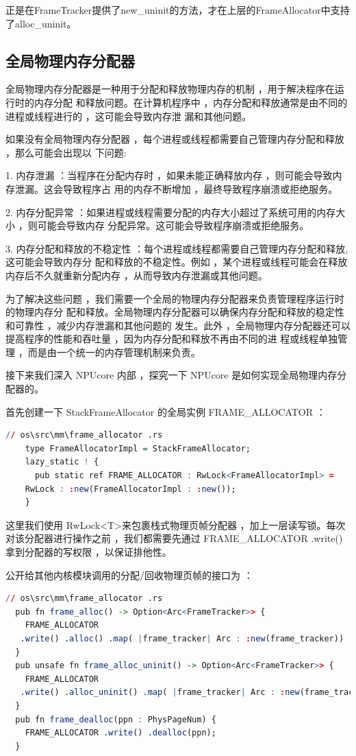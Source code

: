 正是在FrameTracker提供了new\_uninit的方法，才在上层的FrameAllocator中支持了alloc\_uninit。

	\subsection{全局物理内存分配器}
	
	全局物理内存分配器是一种用于分配和释放物理内存的机制 ，用于解决程序在运行时的内存分配 和释放问题。在计算机程序中 ，内存分配和释放通常是由不同的进程或线程进行的 ，这可能会导致内存泄 漏和其他问题。
	
	如果没有全局物理内存分配器 ，每个进程或线程都需要自己管理内存分配和释放 ，那么可能会出现以 下问题:
	
	1. 内存泄漏 ：当程序在分配内存时 ，如果未能正确释放内存 ，则可能会导致内存泄漏。这会导致程序占 用的内存不断增加 ，最终导致程序崩溃或拒绝服务。
	
	2. 内存分配异常 ：如果进程或线程需要分配的内存大小超过了系统可用的内存大小 ，则可能会导致内存 分配异常。这可能会导致程序崩溃或拒绝服务。
	
	3. 内存分配和释放的不稳定性 ：每个进程或线程都需要自己管理内存分配和释放,这可能会导致内存分 配和释放的不稳定性。例如 ，某个进程或线程可能会在释放内存后不久就重新分配内存 ，从而导致内存泄漏或其他问题。
	
	为了解决这些问题 ，我们需要一个全局的物理内存分配器来负责管理程序运行时的物理内存分 配和释放。全局物理内存分配器可以确保内存分配和释放的稳定性和可靠性 ，减少内存泄漏和其他问题的 发生。此外 ，全局物理内存分配器还可以提高程序的性能和吞吐量 ，因为内存分配和释放不再由不同的进 程或线程单独管理 ，而是由一个统一的内存管理机制来负责。
	
	接下来我们深入 NPUcore 内部 ，探究一下 NPUcore 是如何实现全局物理内存分配器的。
	
	首先创建一下  StackFrameAllocator 的全局实例  FRAME\_ALLOCATOR  ：
\begin{lstlisting}[language=R]
  // os\src\mm\frame_allocator .rs
    type FrameAllocatorImpl = StackFrameAllocator;
    lazy_static ! {
      pub static ref FRAME_ALLOCATOR : RwLock<FrameAllocatorImpl> =
    RwLock : :new(FrameAllocatorImpl : :new());
    }
\end{lstlisting}

	这里我们使用  RwLock\textless T\textgreater 来包裹栈式物理页帧分配器 ，加上一层读写锁。每次对该分配器进行操作之前 ，我们都需要先通过  FRAME\_ALLOCATOR .write() 拿到分配器的写权限 ，以保证排他性。
	
	公开给其他内核模块调用的分配/回收物理页帧的接口为 ：
\begin{lstlisting}[language=R]
  // os\src\mm\frame_allocator .rs
  pub fn frame_alloc() -> Option<Arc<FrameTracker>> {
    FRAME_ALLOCATOR
   .write() .alloc() .map( |frame_tracker| Arc : :new(frame_tracker))
  }
  pub unsafe fn frame_alloc_uninit() -> Option<Arc<FrameTracker>> {
    FRAME_ALLOCATOR
   .write() .alloc_uninit() .map( |frame_tracker| Arc : :new(frame_tracker))
  }
  pub fn frame_dealloc(ppn : PhysPageNum) {
    FRAME_ALLOCATOR .write() .dealloc(ppn);
  }
\end{lstlisting}

